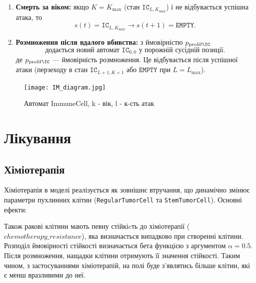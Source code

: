 \documentclass[12pt]{article}
\begin{document}
\begin{itemize}
\begin{enumerate}
      \item \textbf{Смерть за віком:} якщо $K = K_{\max}$ (стан $\mathtt{IC}_{L, K_{\max}}$) і не відбувається успішна атака, то
      \[
        s(t) = \mathtt{IC}_{L, K_{\max}} \to s(t+1) = \mathtt{EMPTY}.
      \]
      \item \textbf{Розмноження після вдалого вбивства:} з ймовірністю $p_{\rm prolif\IC}$
      \[
        \text{додається новий автомат } \mathtt{IC}_{0,0} \text{ у порожній сусідній позиції}.
      \]
      де $p_{\rm prolif\IC}$ — ймовірність розмноження. Це відбувається після успішної атаки (перзеходу в стан $\mathtt{IC}_{L+1, K+1}$ або $\mathtt{EMPTY}$ при $L=L_{\max}$).
    \end{enumerate}

\end{itemize}

\begin{figure}[h] %
    \centering
    \texttt{[image: IM\_diagram.jpg]}
    \caption{Автомат ImmuneCell, k - вік, l - к-сть атак}
    \label{fig:example}
\end{figure}

\section{Лікування}
\label{subsec:chemotherapy}

\subsection{{Хіміотерапія}}
Хіміотерапія в моделі реалізується як зовнішнє втручання, що динамічно змінює параметри пухлинних клітин (\texttt{RegularTumorCell} та \texttt{StemTumorCell}). Основні ефекти:
\begin{itemize}
  \item Зменшення шансу проліферації на фіксований коефіцієнт $\Delta_p = \texttt{PROLIFERATION\_DECREASE}$.
  \item Негайна смерть клітини з шансом $DEATH\_CHEMOTERAPY\_CHANCE}$.
\end{itemize}
Також ракові клітини мають певну стійкіcть до хіміотерапії ($chemotherapy\_resistance$), яка визначається випадково при створенні клітини. Розподіл ймовірності стійкості визначається бета функцією з аргументом $\alpha=0.5$. Після розмноження, нащадки клітини отримують її значення стійкості. Таким чином, з застосуваннями хіміотерапій, на полі буде з'являтись більше клітин, які є менш вразливими до неї.\\
\end{document}
